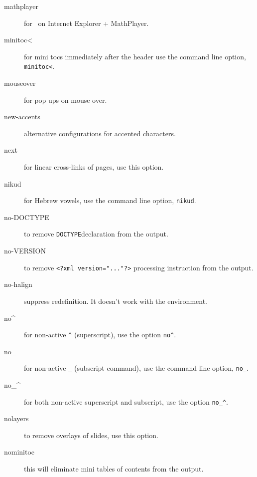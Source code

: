 \begin{description}
\item[mathplayer] for \mathml\ on Internet Explorer + MathPlayer.

\item[minitoc\textless] for mini tocs immediately after the header use the
  command line option, \verb=minitoc<=.

\item[mouseover] for pop ups on mouse over.

\item[new-accents] alternative configurations for accented characters. 

\item[next] for linear cross-links of pages, use this option.

\item[nikud] for Hebrew vowels, use the command line option,
  \verb=nikud=.

\item[no-DOCTYPE] to remove \texttt{DOCTYPE}\space declaration from
  the output.

\item[no-VERSION] to remove \verb+<?xml version="..."?>+ processing
  instruction from the output.

\item[no-halign] suppress \texcommand{\halign} redefinition. It doesn't work with the  environment.

\item[no\textasciicircum] for non-active \verb=^= (superscript), use the option
  \verb=no^=.

\item[no\_] for non-active \verb=_= (subscript command), use the
  command line option, \verb=no_=.

\item[no\_\textasciicircum] for both non-active superscript and subscript, use the
  option \verb=no_^=.

\item[nolayers] to remove overlays of slides, use this option.

\item[nominitoc] this will eliminate mini tables of contents from the
  output.


\end{description}
